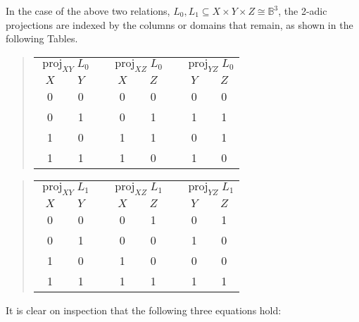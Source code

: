 \documentclass[12pt]{article}
\begin{document}
In the case of the above two relations, $L_0, L_1 \subseteq X \times Y \times Z \cong \mathbb{B}^3$, the 2-adic projections are indexed by the columns or domains that remain, as shown in the following Tables.

\begin{quote}\begin{tabular}{|c|c|p{2cm}|c|c|p{2cm}|c|c|}
\multicolumn{2}{c}{$\operatorname{proj}_{XY}L_0$} &
\multicolumn{1}{c}{ } &
\multicolumn{2}{c}{$\operatorname{proj}_{XZ}L_0$} &
\multicolumn{1}{c}{ } &
\multicolumn{2}{c}{$\operatorname{proj}_{YZ}L_0$} \\
\cline{1-2}\cline{4-5}\cline{7-8}
$X$ & $Y$ & & $X$ & $Z$ & & $Y$ & $Z$ \\
\cline{1-2}\cline{4-5}\cline{7-8}
 0  &  0  & &  0  &  0  & &  0  &  0  \\
\cline{1-2}\cline{4-5}\cline{7-8}
 0  &  1  & &  0  &  1  & &  1  &  1  \\
\cline{1-2}\cline{4-5}\cline{7-8}
 1  &  0  & &  1  &  1  & &  0  &  1  \\
\cline{1-2}\cline{4-5}\cline{7-8}
 1  &  1  & &  1  &  0  & &  1  &  0  \\
\cline{1-2}\cline{4-5}\cline{7-8}
\end{tabular}\end{quote}

\begin{quote}\begin{tabular}{|c|c|p{2cm}|c|c|p{2cm}|c|c|}
\multicolumn{2}{c}{$\operatorname{proj}_{XY}L_1$} &
\multicolumn{1}{c}{ } &
\multicolumn{2}{c}{$\operatorname{proj}_{XZ}L_1$} &
\multicolumn{1}{c}{ } &
\multicolumn{2}{c}{$\operatorname{proj}_{YZ}L_1$} \\
\cline{1-2}\cline{4-5}\cline{7-8}
$X$ & $Y$ & & $X$ & $Z$ & & $Y$ & $Z$ \\
\cline{1-2}\cline{4-5}\cline{7-8}
 0  &  0  & &  0  &  1  & &  0  &  1  \\
\cline{1-2}\cline{4-5}\cline{7-8}
 0  &  1  & &  0  &  0  & &  1  &  0  \\
\cline{1-2}\cline{4-5}\cline{7-8}
 1  &  0  & &  1  &  0  & &  0  &  0  \\
\cline{1-2}\cline{4-5}\cline{7-8}
 1  &  1  & &  1  &  1  & &  1  &  1  \\
\cline{1-2}\cline{4-5}\cline{7-8}
\end{tabular}\end{quote}

It is clear on inspection that the following three equations hold:
\end{document}
